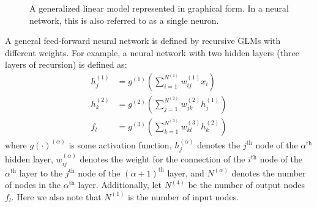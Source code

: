 \def\layersep{2.5cm}
\begin{figure}[h]
\centering{}

\caption{\label{fig:GLM}
A generalized linear model represented in graphical form.
In a neural network, this is also referred to as a single neuron.
}
\end{figure}

\pagebreak

A general feed-forward neural network is defined by recursive GLMs
with different weights.
For example, a neural network with two hidden layers
(three layers of recursion) is defined as:
%
\begin{equation}
\begin{aligned}
	h^{(1)}_j &= g^{(1)}
		\left(\sum_{i=1}^{N^{(1)}} w_{ij}^{(1)} x_i \right) \\
	h^{(2)}_k &= g^{(2)}
		\left(\sum_{j=1}^{N^{(2)}} w_{jk}^{(2)} h_j^{(1)} \right) \\
	f_l &= g^{(3)}
		\left(\sum_{k=1}^{N^{(3)}} w_{kl}^{(3)} h_k^{(2)} \right)
\end{aligned}
\end{equation}
%
where $g(\cdot)^{(\alpha)}$ is some activation function,
$h^{(\alpha)}_j$ denotes the $j^\text{th}$ node of the $\alpha^\text{th}$ 
hidden layer,
$w_{ij}^{(\alpha)}$ denotes the weight for the connection of 
the $i^\text{th}$ node of the $\alpha^\text{th}$ layer to 
the $j^\text{th}$ node of the $(\alpha+1)^\text{th}$ layer,
and $N^{(\alpha)}$ denotes the number of nodes in the $\alpha^\text{th}$ layer.
Additionally, let $N^{(4)}$ be the number of 
output nodes $f_l$.
Here we also note that $N^{(1)}$ is the number of input nodes.

